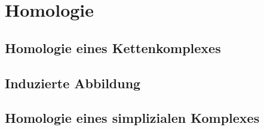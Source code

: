 %
%
%
\section{Homologie
\label{buch:section:homologie}}

\subsection{Homologie eines Kettenkomplexes
\label{buch:subsection:homologie-eines-kettenkomplexes}}

\subsection{Induzierte Abbildung
\label{buch:subsection:induzierte-abbildung}}

\subsection{Homologie eines simplizialen Komplexes
\label{buch:subsection:simplizialekomplexe}}


